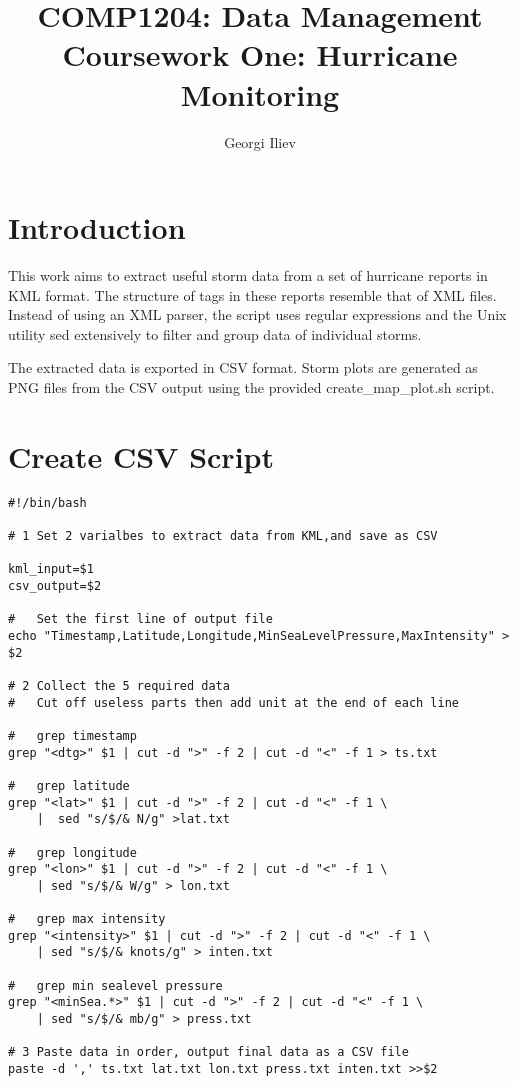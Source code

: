 \documentclass[]{article}
\title{COMP1204: Data Management \\ Coursework One: Hurricane Monitoring }
\author{Georgi Iliev}
\begin{document}
\maketitle

\section{Introduction}
This work aims to extract useful storm data from a set of hurricane reports in KML format.
The structure of tags in these reports resemble that of XML files.
Instead of using an XML parser, the script uses regular expressions and
the Unix utility sed extensively to filter and group data of individual storms.

{\parskip=7pt
The extracted data is exported in CSV format. Storm plots are generated as PNG files
from the CSV output using the provided create\_map\_plot.sh script.}

\section{Create CSV Script}

\begin{verbatim}
#!/bin/bash

# 1 Set 2 varialbes to extract data from KML,and save as CSV

kml_input=$1
csv_output=$2

#   Set the first line of output file
echo "Timestamp,Latitude,Longitude,MinSeaLevelPressure,MaxIntensity" > $2

# 2 Collect the 5 required data
# 	Cut off useless parts then add unit at the end of each line

#   grep timestamp
grep "<dtg>" $1 | cut -d ">" -f 2 | cut -d "<" -f 1 > ts.txt

#   grep latitude
grep "<lat>" $1 | cut -d ">" -f 2 | cut -d "<" -f 1 \
    |  sed "s/$/& N/g" >lat.txt

#   grep longitude
grep "<lon>" $1 | cut -d ">" -f 2 | cut -d "<" -f 1 \
    | sed "s/$/& W/g" > lon.txt

#   grep max intensity
grep "<intensity>" $1 | cut -d ">" -f 2 | cut -d "<" -f 1 \
    | sed "s/$/& knots/g" > inten.txt

#   grep min sealevel pressure
grep "<minSea.*>" $1 | cut -d ">" -f 2 | cut -d "<" -f 1 \
    | sed "s/$/& mb/g" > press.txt

# 3 Paste data in order, output final data as a CSV file
paste -d ',' ts.txt lat.txt lon.txt press.txt inten.txt >>$2
\end{verbatim}
\end{document}

